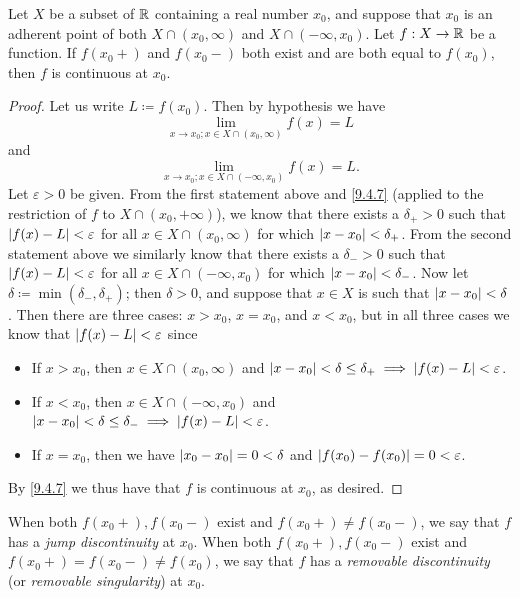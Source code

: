 \setcounter{thm}{2}
\begin{prop}\label{9.5.3}
  Let \(X\) be a subset of \(\mathbb{R}\) containing a real number \(x_0\), and suppose that \(x_0\) is an adherent point of both \(X \cap (x_0, \infty)\) and \(X \cap (-\infty, x_0)\).
  Let \(f : X \to \mathbb{R}\) be a function.
  If \(f(x_0+)\) and \(f(x_0-)\) both exist and are both equal to \(f(x_0)\), then \(f\) is continuous at \(x_0\).
\end{prop}

\begin{proof}
  Let us write \(L \coloneqq f(x_0)\).
  Then by hypothesis we have
  \[
    \lim_{x \to x_0 ; x \in X \cap (x_0, \infty)} f(x) = L
  \]
  and
  \[
    \lim_{x \to x_0 ; x \in X \cap (-\infty, x_0)} f(x) = L.
  \]
  Let \(\varepsilon > 0\) be given.
  From the first statement above and \cref{9.4.7} (applied to the restriction of \(f\) to \(X \cap (x_0, +\infty)\)), we know that there exists a \(\delta_+ > 0\) such that \(\left\lvert f(x) - L\right\rvert < \varepsilon\) for all \(x \in X \cap(x_0, \infty)\) for which \(\left\lvert x - x_0\right\rvert < \delta_+\).
  From the second statement above we similarly know that there exists a \(\delta_- > 0\) such that \(\left\lvert f(x) - L\right\rvert < \varepsilon\) for all \(x \in X \cap (-\infty, x_0)\) for which \(\left\lvert x - x_0\right\rvert < \delta_-\).
  Now let \(\delta \coloneqq \min(\delta_-, \delta_+)\);
  then \(\delta > 0\), and suppose that \(x \in X\) is such that \(\left\lvert x - x_0\right\rvert < \delta\).
  Then there are three cases:
  \(x > x_0\), \(x = x_0\), and \(x < x_0\), but in all three cases we know that \(\left\lvert f(x) - L\right\rvert < \varepsilon\) since
  \begin{itemize}
    \item If \(x > x_0\), then \(x \in X \cap (x_0, \infty)\) and \(\left\lvert x - x_0\right\rvert < \delta \leq \delta_+ \implies \left\lvert f(x) - L\right\rvert < \varepsilon\).
    \item If \(x < x_0\), then \(x \in X \cap (-\infty, x_0)\) and \(\left\lvert x - x_0\right\rvert < \delta \leq \delta_- \implies \left\lvert f(x) - L\right\rvert < \varepsilon\).
    \item If \(x = x_0\), then we have \(\left\lvert x_0 - x_0\right\rvert = 0 < \delta\) and \(\left\lvert f(x_0) - f(x_0)\right\rvert = 0 < \varepsilon\).
  \end{itemize}
  By \cref{9.4.7} we thus have that \(f\) is continuous at \(x_0\), as desired.
\end{proof}

\begin{note}
  When both \(f(x_0+), f(x_0-)\) exist and \(f(x_0+) \neq f(x_0-)\), we say that \(f\) has a \emph{jump discontinuity} at \(x_0\).
  When both \(f(x_0+), f(x_0-)\) exist and \(f(x_0+) = f(x_0-) \neq f(x_0)\), we say that \(f\) has a \emph{removable discontinuity} (or \emph{removable singularity}) at \(x_0\).
\end{note}

